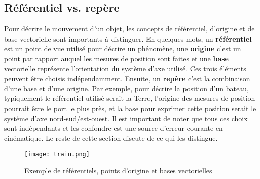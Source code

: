 \subsection{Référentiel vs. repère}
Pour décrire le mouvement d'un objet, les concepts de référentiel, d'origine et de base vectorielle sont importants à distinguer. En quelques mots, un \textbf{référentiel} est un point de vue utilisé pour décrire un phénomène, une \textbf{origine} c'est un point par rapport auquel les mesures de position sont faites et une \textbf{base} vectorielle représente l'orientation du système d'axe utilisé. Ces trois éléments peuvent être choisis indépendamment.  Ensuite, un \textbf{repère} c'est la combinaison d'une base et d'une origine. Par exemple, pour décrire la position d'un bateau, typiquement le référentiel utilisé serait la Terre, l'origine des mesures de position pourrait être le port le plus près, et la base pour exprimer cette position serait le système d'axe nord-sud/est-ouest. Il est important de noter que tous ces choix sont indépendants et les confondre est une source d'erreur courante en cinématique. Le reste de cette section discute de ce qui les distingue.

\begin{figure}[H]
	\centering
	\texttt{[image: train.png]}
	\caption{Exemple de référentiels, points d'origine et bases vectorielles}
	\label{fig:train}
\end{figure}

